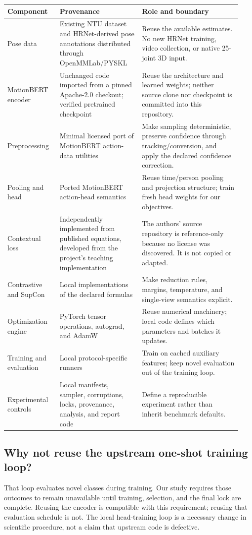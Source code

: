 \begin{longtable}{@{}P{0.21\linewidth}P{0.33\linewidth}P{0.40\linewidth}@{}}
\toprule Component & Provenance & Role and boundary\\\midrule\endhead
Pose data & Existing NTU dataset and HRNet-derived pose annotations distributed
through OpenMMLab/PYSKL & Reuse the available estimates. No new HRNet training,
video collection, or native 25-joint 3D input.\\\addlinespace
MotionBERT encoder & Unchanged code imported from a pinned Apache-2.0 checkout;
verified pretrained checkpoint & Reuse the architecture and learned weights;
neither source clone nor checkpoint is committed into this repository.\\\addlinespace
Preprocessing & Minimal licensed port of MotionBERT action-data utilities & Make
sampling deterministic, preserve confidence through tracking/conversion, and
apply the declared confidence correction.\\\addlinespace
Pooling and head & Ported MotionBERT action-head semantics & Reuse time/person
pooling and projection structure; train fresh head weights for our objectives.\\\addlinespace
Contextual loss & Independently implemented from published equations, developed
from the project's teaching implementation & The authors' source repository is
reference-only because no license was discovered. It is not copied or adapted.\\\addlinespace
Contrastive and SupCon & Local implementations of the declared formulas & Make
reduction rules, margins, temperature, and single-view semantics explicit.\\\addlinespace
Optimization engine & PyTorch tensor operations, autograd, and AdamW & Reuse
numerical machinery; local code defines which parameters and batches it updates.\\\addlinespace
Training and evaluation & Local protocol-specific runners & Train on cached
auxiliary features; keep novel evaluation out of the training loop.\\\addlinespace
Experimental controls & Local manifests, sampler, corruptions, locks, provenance,
analysis, and report code & Define a reproducible experiment rather than inherit
benchmark defaults.\\\bottomrule
\end{longtable}

\subsection{Why not reuse the upstream one-shot training loop?}
That loop evaluates novel classes during training. Our study requires those
outcomes to remain unavailable until training, selection, and the final lock
are complete. Reusing the encoder is compatible with this requirement; reusing
that evaluation schedule is not. The local head-training loop is a necessary
change in scientific procedure, not a claim that upstream code is defective.


